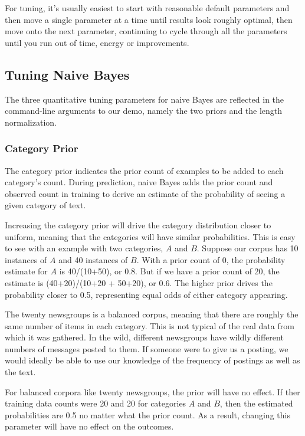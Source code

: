 For tuning, it's usually easiest to start with reasonable default
parameters and then move a single parameter at a time until results
look roughly optimal, then move onto the next parameter, continuing
to cycle through all the parameters until you run out of time,
energy or improvements.


\subsection{Tuning Naive Bayes}

The three quantitative tuning parameters for naive Bayes are reflected
in the command-line arguments to our demo, namely the two priors and
the length normalization.  

\subsubsection{Category Prior}

The category prior indicates the prior count of examples to be added
to each category's count.  During prediction, naive Bayes adds the
prior count and observed count in training to derive an estimate of
the probability of seeing a given category of text.  

Increasing the category prior will drive the category distribution
closer to uniform, meaning that the categories will have similar
probabilities.  This is easy to see with an example with two
categories, $A$ and $B$.  Suppose our corpus has 10 instances of $A$
and 40 instances of $B$.  With a prior count of 0, the probability
estimate for $A$ is 40/(10+50), or 0.8.  But if we have a prior count
of 20, the estimate is (40+20)/(10+20 + 50+20), or 0.6.  The higher
prior drives the probability closer to 0.5, representing equal odds
of either category appearing.

The twenty newsgroups is a balanced corpus, meaning that there are
roughly the same number of items in each category.  This is not
typical of the real data from which it was gathered.  In the wild,
different newsgroups have wildly different numbers of messages posted
to them.  If someone were to give us a posting, we would ideally be
able to use our knowledge of the frequency of postings as well as the
text.  

For balanced corpora like twenty newsgroups, the prior will have no
effect.  If ther training data counts were 20 and 20 for categories
$A$ and $B$, then the estimated probabilities are 0.5 no matter
what the prior count.  As a result, changing this parameter will
have no effect on the outcomes.

